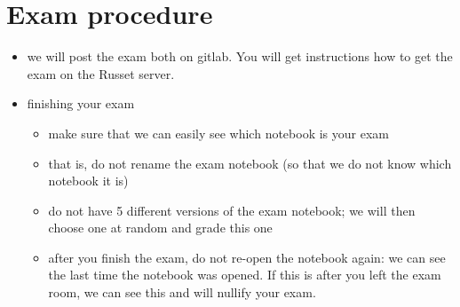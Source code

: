 \documentclass[]{book}
\providecommand{\tightlist}{%
  \setlength{\itemsep}{0pt}\setlength{\parskip}{0pt}}
\begin{document}
\section{Exam procedure}\label{exam-procedure}

\begin{itemize}
\tightlist
\item
  we will post the exam both on gitlab. You will get instructions how to
  get the exam on the Russet server.
\item
  finishing your exam

  \begin{itemize}
  \tightlist
  \item
    make sure that we can easily see which notebook is your exam
  \item
    that is, do not rename the exam notebook (so that we do not know
    which notebook it is)
  \item
    do not have 5 different versions of the exam notebook; we will then
    choose one at random and grade this one
  \item
    after you finish the exam, do not re-open the notebook again: we can
    see the last time the notebook was opened. If this is after you left
    the exam room, we can see this and will nullify your exam.
  \end{itemize}
\end{itemize}


\end{document}
